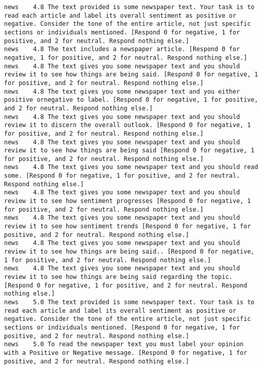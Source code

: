 \begin{lstlisting}[label=lst:promptvariants]
news	4.8	The text provided is some newspaper text. Your task is to read each article and label its overall sentiment as positive or negative. Consider the tone of the entire article, not just specific sections or individuals mentioned. [Respond 0 for negative, 1 for positive, and 2 for neutral. Respond nothing else.]
news	4.8	The text includes a newspaper article. [Respond 0 for negative, 1 for positive, and 2 for neutral. Respond nothing else.]
news	4.8	The text gives you some newspaper text and you should review it to see how things are being said. [Respond 0 for negative, 1 for positive, and 2 for neutral. Respond nothing else.]
news	4.8	The text gives you some newspaper text and you either positive ornegative to label. [Respond 0 for negative, 1 for positive, and 2 for neutral. Respond nothing else.]
news	4.8	The text gives you some newspaper text and you should review it to discern the overall outlook. [Respond 0 for negative, 1 for positive, and 2 for neutral. Respond nothing else.]
news	4.8	The text gives you some newspaper text and you should review it to see how things are being said [Respond 0 for negative, 1 for positive, and 2 for neutral. Respond nothing else.]
news	4.8	The text gives you some newspaper text and you should read some. [Respond 0 for negative, 1 for positive, and 2 for neutral. Respond nothing else.]
news	4.8	The text gives you some newspaper text and you should review it to see how sentiment progresses [Respond 0 for negative, 1 for positive, and 2 for neutral. Respond nothing else.]
news	4.8	The text gives you some newspaper text and you should review it to see how sentiment trends [Respond 0 for negative, 1 for positive, and 2 for neutral. Respond nothing else.]
news	4.8	The text gives you some newspaper text and you should review it to see how things are being said.. [Respond 0 for negative, 1 for positive, and 2 for neutral. Respond nothing else.]
news	4.8	The text gives you some newspaper text and you should review it to see how things are being said regarding the topic. [Respond 0 for negative, 1 for positive, and 2 for neutral. Respond nothing else.]
news	5.0	The text provided is some newspaper text. Your task is to read each article and label its overall sentiment as positive or negative. Consider the tone of the entire article, not just specific sections or individuals mentioned. [Respond 0 for negative, 1 for positive, and 2 for neutral. Respond nothing else.]
news	5.0	To read the newspaper text you must label your opinion with a Positive or Negative message. [Respond 0 for negative, 1 for positive, and 2 for neutral. Respond nothing else.]

\end{lstlisting}
